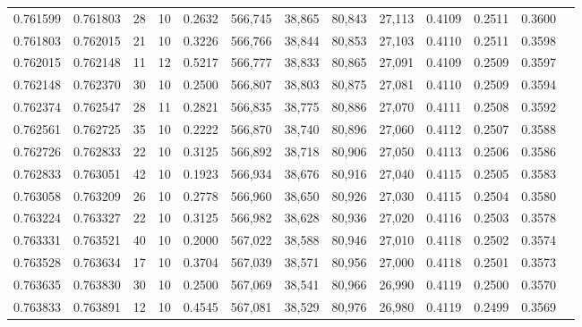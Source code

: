 \begin{tabular}{rrrrrrrrrrrrr}
0.761599 & 0.761803 &    28 &  10 &                                     0.2632 & 566,745 &  38,865 &  80,843 &  27,113 & 0.4109 & 0.2511 & 0.3600 \\
0.761803 & 0.762015 &    21 &  10 &                                     0.3226 & 566,766 &  38,844 &  80,853 &  27,103 & 0.4110 & 0.2511 & 0.3598 \\
0.762015 & 0.762148 &    11 &  12 &                                     0.5217 & 566,777 &  38,833 &  80,865 &  27,091 & 0.4109 & 0.2509 & 0.3597 \\
0.762148 & 0.762370 &    30 &  10 &                                     0.2500 & 566,807 &  38,803 &  80,875 &  27,081 & 0.4110 & 0.2509 & 0.3594 \\
0.762374 & 0.762547 &    28 &  11 &                                     0.2821 & 566,835 &  38,775 &  80,886 &  27,070 & 0.4111 & 0.2508 & 0.3592 \\
0.762561 & 0.762725 &    35 &  10 &                                     0.2222 & 566,870 &  38,740 &  80,896 &  27,060 & 0.4112 & 0.2507 & 0.3588 \\
0.762726 & 0.762833 &    22 &  10 &                                     0.3125 & 566,892 &  38,718 &  80,906 &  27,050 & 0.4113 & 0.2506 & 0.3586 \\
0.762833 & 0.763051 &    42 &  10 &                                     0.1923 & 566,934 &  38,676 &  80,916 &  27,040 & 0.4115 & 0.2505 & 0.3583 \\
0.763058 & 0.763209 &    26 &  10 &                                     0.2778 & 566,960 &  38,650 &  80,926 &  27,030 & 0.4115 & 0.2504 & 0.3580 \\
0.763224 & 0.763327 &    22 &  10 &                                     0.3125 & 566,982 &  38,628 &  80,936 &  27,020 & 0.4116 & 0.2503 & 0.3578 \\
0.763331 & 0.763521 &    40 &  10 &                                     0.2000 & 567,022 &  38,588 &  80,946 &  27,010 & 0.4118 & 0.2502 & 0.3574 \\
0.763528 & 0.763634 &    17 &  10 &                                     0.3704 & 567,039 &  38,571 &  80,956 &  27,000 & 0.4118 & 0.2501 & 0.3573 \\
0.763635 & 0.763830 &    30 &  10 &                                     0.2500 & 567,069 &  38,541 &  80,966 &  26,990 & 0.4119 & 0.2500 & 0.3570 \\
0.763833 & 0.763891 &    12 &  10 &                                     0.4545 & 567,081 &  38,529 &  80,976 &  26,980 & 0.4119 & 0.2499 & 0.3569 \\

\end{tabular}
